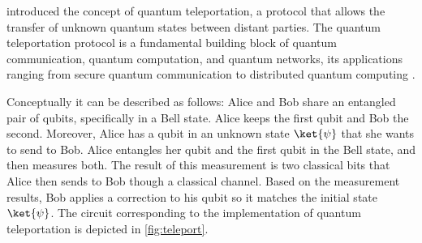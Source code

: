 \label{ex:quantum_teleportation_syntax}
\cite{bennett1993teleporting} introduced the concept of quantum teleportation,
a protocol that allows the transfer of  unknown quantum states between distant
parties.  The quantum teleportation protocol is a fundamental building block of
quantum communication, quantum computation, and quantum networks, its
applications ranging from secure quantum communication to distributed quantum
computing
\cite{briegel1998quantum,gottesman1999demonstrating,kimble2008quantum}.

Conceptually it can be described as follows: Alice and Bob share an entangled
pair of qubits, specifically in a Bell state. Alice keeps the first qubit and
Bob the second. Moreover, Alice has a qubit in an unknown state $\ket{\psi}$
that she wants to send to Bob.  Alice entangles her qubit and the first qubit
in the Bell state, and then measures both. The result of this measurement is
two classical bits that Alice then sends to Bob though a classical channel.
Based on the measurement results, Bob applies a correction to his qubit so it
matches the initial state $\ket{\psi}$.  The circuit corresponding to the
implementation of quantum teleportation is depicted in \autoref{fig:teleport}.



